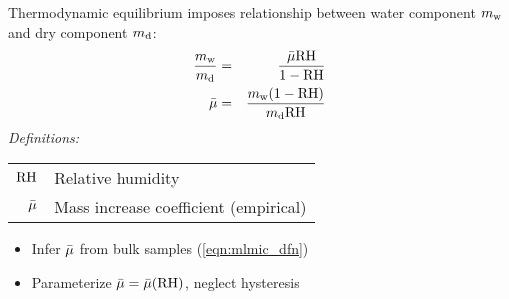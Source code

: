 \documentclass[final,dvips]{foils}
\begin{document}
\rotatefoilhead{%
\Large\textcolor{blue}{\hfill Hygroscopic Growth \hfill}}\vspace{-0.5in}\large
Thermodynamic equilibrium imposes relationship between water
component $\mssaerwtr$ and dry component $\mssaerdry$:
\begin{eqnarray}
{ m_{\mathrm{w}}\over m_{\mathrm{d}}} & = & 
{ \bar{\mu} \mbox{\textrm{RH}} \over 1 - \mbox{\textrm{RH}} } \\
\bar{\mu} & = & { m_{\mathrm{w}} ( 1 - \mbox{\textrm{RH}} ) \over m_{\mathrm{d}} \mbox{\textrm{RH}}}
\label{eqn:mlmic_dfn}
\end{eqnarray}
\emph{Definitions:}
\begin{table}
\begin{tabular}{ >{$}r<{$} l}
\RH & Relative humidity \\[1.0ex]
\mlmic & Mass increase coefficient (empirical) \\[0.0ex]
\end{tabular}
\end{table}
\begin{itemize}
\item Infer $\mlmic$ from bulk samples (\ref{eqn:mlmic_dfn}) 
\item Parameterize $\mlmic = \mlmic(\RH)$, neglect hysteresis
\end{itemize}
\end{document}

